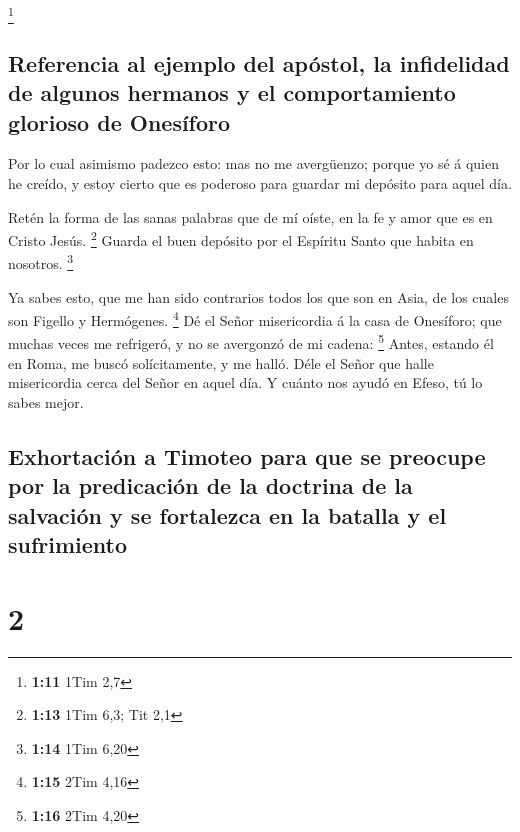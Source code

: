 \footnote{\textbf{1:11} 1Tim 2,7}

\hypertarget{referencia-al-ejemplo-del-apuxf3stol-la-infidelidad-de-algunos-hermanos-y-el-comportamiento-glorioso-de-onesuxedforo}{%
\subsection{Referencia al ejemplo del apóstol, la infidelidad de algunos
hermanos y el comportamiento glorioso de
Onesíforo}\label{referencia-al-ejemplo-del-apuxf3stol-la-infidelidad-de-algunos-hermanos-y-el-comportamiento-glorioso-de-onesuxedforo}}

 Por lo cual asimismo padezco esto: mas no me avergüenzo;
porque yo sé á quien he creído, y estoy cierto que es poderoso para
guardar mi depósito para aquel día.

 Retén la forma de las sanas palabras que de mí oíste, en
la fe y amor que es en Cristo Jesús. \footnote{\textbf{1:13} 1Tim 6,3;
  Tit 2,1}  Guarda el buen depósito por el Espíritu Santo
que habita en nosotros. \footnote{\textbf{1:14} 1Tim 6,20}

 Ya sabes esto, que me han sido contrarios todos los que
son en Asia, de los cuales son Figello y Hermógenes. \footnote{\textbf{1:15}
  2Tim 4,16}  Dé el Señor misericordia á la casa de
Onesíforo; que muchas veces me refrigeró, y no se avergonzó de mi
cadena: \footnote{\textbf{1:16} 2Tim 4,20}  Antes,
estando él en Roma, me buscó solícitamente, y me halló. 
Déle el Señor que halle misericordia cerca del Señor en aquel día. Y
cuánto nos ayudó en Efeso, tú lo sabes mejor.

\hypertarget{exhortaciuxf3n-a-timoteo-para-que-se-preocupe-por-la-predicaciuxf3n-de-la-doctrina-de-la-salvaciuxf3n-y-se-fortalezca-en-la-batalla-y-el-sufrimiento}{%
\subsection{Exhortación a Timoteo para que se preocupe por la
predicación de la doctrina de la salvación y se fortalezca en la batalla
y el
sufrimiento}\label{exhortaciuxf3n-a-timoteo-para-que-se-preocupe-por-la-predicaciuxf3n-de-la-doctrina-de-la-salvaciuxf3n-y-se-fortalezca-en-la-batalla-y-el-sufrimiento}}

\hypertarget{section-1}{%
\section{2}\label{section-1}}

